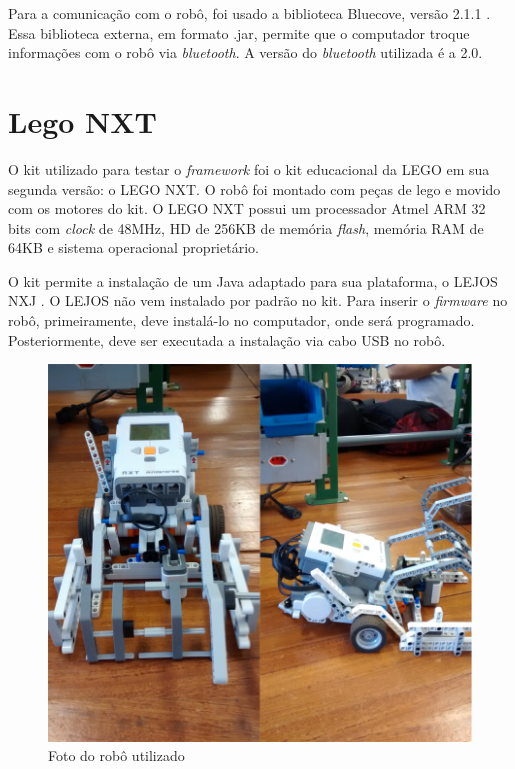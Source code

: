 Para a comunicação com o robô, foi usado a biblioteca Bluecove, versão 2.1.1 \cite{SITE_BLUECOVE}. Essa biblioteca externa, em formato .jar, permite que o computador troque informações com o robô via \textit{bluetooth}. A versão do \textit{bluetooth} utilizada é a 2.0.

\section{Lego NXT}

O kit utilizado para testar o \textit{framework} foi o kit educacional da LEGO em sua segunda versão: o LEGO NXT. O robô foi montado com peças de lego e movido com os motores do kit. O LEGO NXT possui um processador Atmel ARM 32 bits com \textit{clock} de 48MHz, HD de 256KB de memória \textit{flash}, memória RAM de 64KB e sistema operacional proprietário.

O kit permite a instalação de um Java adaptado para sua plataforma, o LEJOS NXJ \cite{LEJOS_SITE}. O LEJOS não vem instalado por padrão no kit. Para inserir o \textit{firmware} no robô, primeiramente, deve instalá-lo no computador, onde será programado. Posteriormente, deve ser executada a instalação via cabo USB no robô.

\begin{figure}[h]
	\centering
	\label{fig17}
		\includegraphics[keepaspectratio=true,scale=0.2]{figuras/5nxtBrick.png}
	\caption{Foto do robô utilizado}
\end{figure}

